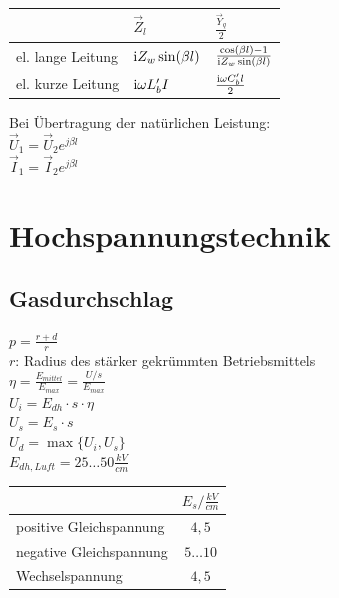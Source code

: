 \documentclass[fs, footer]{latex4ei}
\begin{document}
\begin{multicols}{4}
		
		\begin{tabular}{lll}
		& $\vec Z_l$ & $\frac{\vec Y_q}{2}$\\[0.5em] \midrule
		el. lange Leitung & $\mathrm{i} Z_w \sin(\beta l)$ & $\frac{\cos(\beta l) -1}{\mathrm{i} Z_w \sin(\beta l)}$\\[0.5em]
		el. kurze Leitung & $\mathrm{i} \omega L'_b I$ & $\frac{\mathrm{i} \omega C'_b l}{2}$\\[0.5em]
		\end{tabular}
		
		Bei Übertragung der natürlichen Leistung: \\
		$\vec U_1 = \vec U_2 e^{j \beta l}$ \\
		$\vec I_1 = \vec I_2 e^{j \beta l}$ \\


	\section{Hochspannungstechnik}
		\subsection{Gasdurchschlag}
		$p = \frac{r + d}{r}$ \\
		$r$: Radius des stärker gekrümmten Betriebsmittels \\
		$\eta = \frac{E_{mittel}}{E_{max}} = \frac{U/s}{E_{max}}$ \\
		$U_i = E_{dh} \cdot s \cdot \eta$ \\
		$U_s = E_s \cdot s$ \\
		$U_d = \max\{U_i, U_s\}$ \\
		$E_{dh,Luft} = 25 \hdots 50 \frac{kV}{cm}$ \\
		\begin{tabular}{l|c}
		 & $E_s / \frac{kV}{cm}$ \\ \hline
		 positive Gleichspannung & $4,5$ \\ \hline
		 negative Gleichspannung & $5 \hdots 10$ \\ \hline
		 Wechselspannung & $4,5$
		\end{tabular}


\end{multicols}
\end{document}
